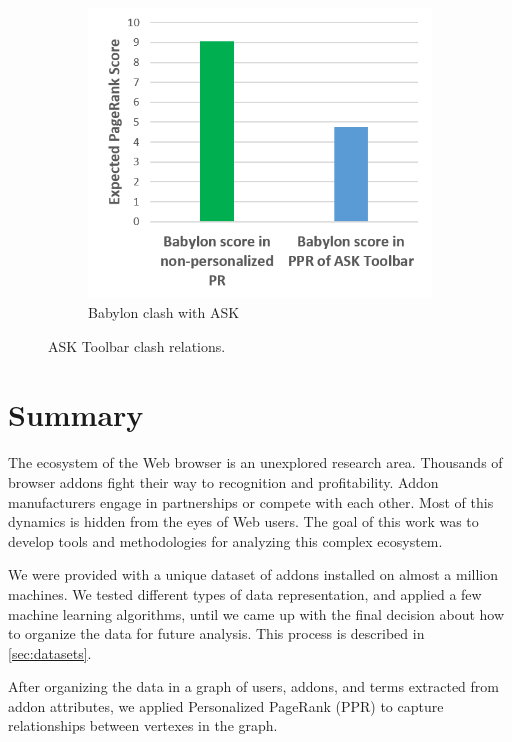 \documentclass[ijoc,nonblindrev]{informs3} %
\numberwithin{equation}{subsection}
\begin{document}
\begin{figure}[!htbp]
\begin{subfigure}[b]{0.4\textwidth}
\includegraphics[width=\textwidth]{figures/babylon_nosym_ask.png}
\caption{Babylon clash with ASK}
\label{fig:babylon_nosym_ask}
\end{subfigure}
\caption{ASK Toolbar clash relations.}
	\label{fig:clash_1}
\end{figure}


\section{Summary}
\label{chap:summary}

The ecosystem of the Web browser is an unexplored research area. Thousands of browser addons fight their way to recognition and profitability. Addon manufacturers engage in partnerships or compete with each other. Most of this dynamics is hidden from the eyes of Web users. The goal of this work was to develop tools and methodologies for analyzing this complex ecosystem.

We were provided with a unique dataset of addons installed on almost a million machines. We tested different types of data representation, and applied a few machine learning algorithms, until we came up with the final decision about how to organize the data for future analysis. This process is described in \autoref{sec:datasets}.

After organizing the data in a graph of users, addons, and terms extracted from addon attributes, we applied Personalized PageRank (PPR) to capture relationships between vertexes in the graph.
\end{document}
